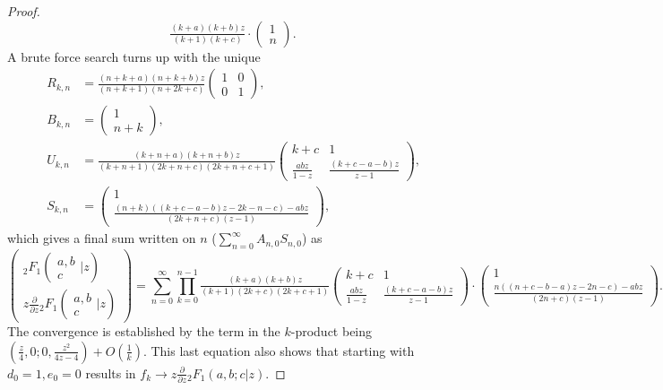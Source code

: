 \documentclass[12pt]{article}
\numberwithin{equation}{section}
\newcommand{\Head}[3] {{}_{#1}{#2}_{#3}}
\newcommand{\ArgS}[3] {( \begin{smallmatrix} #1 \\ #2 \end{smallmatrix} | {#3})}
\begin{document}
\begin{proof}
\begin{equation*}
\tfrac{(k+a)(k+b)z}{(k+1)(k+c)}
\cdot \left(\begin{smallmatrix}
1 \\
n
\end{smallmatrix}\right)\text{.}
\end{equation*}
A brute force search turns up with the unique
\begin{align*}
R_{k,n} &= \tfrac{(n+k+a)(n+k+b)z}{(n+k+1)(n+2k+c)} (\begin{smallmatrix}
1 & 0 \\
0 & 1
\end{smallmatrix})\text{,}\\
B_{k,n} &= (\begin{smallmatrix}
1 \\
n+k
\end{smallmatrix})\text{,}\\
U_{k,n} &= \tfrac{(k+n+a)(k+n+b)z}{(k+n+1)(2k+n+c)(2k+n+c+1)}
\left(\begin{smallmatrix}
k+c & 1 \\
\tfrac{a b z}{1-z} & \tfrac{(k+c-a-b)z}{z-1}
\end{smallmatrix}\right)\text{,}\\
S_{k,n} &= \left(\begin{smallmatrix}
1 \\
\tfrac{(n+k)((k+c-a-b)z-2k-n-c)-a b z}{(2k+n+c)(z-1)}
\end{smallmatrix}\right)\text{,}
\end{align*}
which gives a final sum written on $n$ ($\sum_{n=0}^{\infty} A_{n,0}S_{n,0}$) as
\begin{equation*}
\begin{pmatrix}
\Head{2}{F}{1} \ArgS{a,b}{c}{z} \\ z \frac{\partial}{\partial z} \Head{2}{F}{1}\ArgS{a,b}{c}{z}
\end{pmatrix} = \sum_{n=0}^{\infty}
\prod_{k=0}^{n-1}
\tfrac{(k+a)(k+b)z}{(k+1)(2k+c)(2k+c+1)}
\left(\begin{smallmatrix}
k+c & 1 \\
\tfrac{a b z}{1-z} & \tfrac{(k+c-a-b)z}{z-1}
\end{smallmatrix}\right)
\cdot \left(\begin{smallmatrix}
1 \\
\tfrac{n((n+c-b-a)z-2n-c)-a b z}{(2n+c)(z-1)}
\end{smallmatrix}\right)\text{.}
\end{equation*}
The convergence is established by the term in the $k$-product being $(\frac{z}{4}, 0; 0,\frac{z^2}{4z-4})+ O(\frac{1}{k})$. This last equation also shows that starting with $d_0=1, e_0=0$ results in $f_k \to z \frac{\partial}{\partial z} \Head{2}{F}{1}(a,b;c|z)$.
\end{proof}
\end{document}
